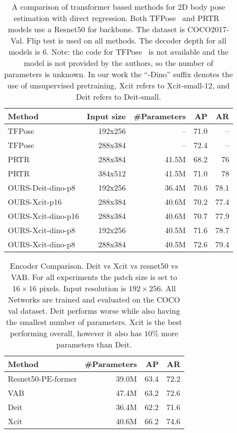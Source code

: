 \documentclass[runningheads]{llncs}
\begin{document}
\begin{table}[t]
  \centering
  \begin{tabular}{|l||r|r|r|r|}
   \hline 
   {\bf Method} & {\bf Input size} & {\bf \#Parameters} & {\bf AP} & {\bf AR} \\
   \hline\hline
   TFPose       & 192x256 & --    & 71.0 & -- \\
   \hline
   TFPose       & 288x384 & --    & 72.4 & -- \\
   \hline
   PRTR         & 288x384 & 41.5M & 68.2 & 76 \\ 
   \hline
   PRTR         & 384x512 & 41.5M & 71.0 & 78 \\ 
   \hline
   OURS-Deit-dino-p8  & 192x256 & 36.4M & 70.6 & 78.1 \\
   \hline
   OURS-Xcit-p16      & 288x384 & 40.6M & 70.2 & 77.4 \\
   \hline
OURS-Xcit-dino-p16 & 288x384 & 40.6M & 70.7 & 77.9 \\ 
   \hline
OURS-Xcit-dino-p8  & 192x256 & 40.5M & 71.6 & 78.7 \\ 
   \hline
OURS-Xcit-dino-p8  & 288x384 & 40.5M & 72.6 & 79.4 \\ 
   
   \hline
  \end{tabular}
  \caption{A comparison of transformer based methods for 2D body pose estimation with direct regression. Both TFPose~\cite{mao2021tfpose} and PRTR~\cite{li2021pose} models use a Resnet50 for backbone. The dataset is COCO2017-Val. Flip test is used on all methods. The decoder depth for all models is $6$. Note: the code for TFPose~\cite{mao2021tfpose} is not available and the model is not provided by the authors, so the number of parameters is unknown. In our work the ``-Dino'' suffix denotes the use of unsupervised pretraining, Xcit refers to Xcit-small-12, and Deit refers to Deit-small.}
  \label{tab:cmp}
\end{table}


\begin{table}[t]
  \centering
  \begin{tabular}{|l||r|r|r|}
   \hline 
   {\bf Method} &  {\bf \#Parameters}  & {\bf AP} & {\bf AR} \\
   \hline\hline
   Resnet50-PE-former   & 39.0M & 63.4 & 72.2 \\ 
   \hline
   VAB             & 47.4M & 63.2 & 72.6 \\ 
   \hline
   Deit             & 36.4M & 62.2 & 71.6 \\ 
   \hline
   Xcit            & 40.6M & 66.2 & 74.6 \\ 
   \hline
  \end{tabular}
  \caption{Encoder Comparison. Deit vs Xcit vs resnet50 vs VAB. 
  For all experiments the patch size is set to $16 \times 16$ pixels. Input resolution is $192 \times 256$.
  All Networks are trained and evaluated on the COCO val dataset. Deit performs worse while also having the smallest number of parameters. Xcit is the best performing overall, however it also has $10\%$ more parameters than Deit.}
  \label{tab:enc_cmp}
\end{table}
\end{document}
